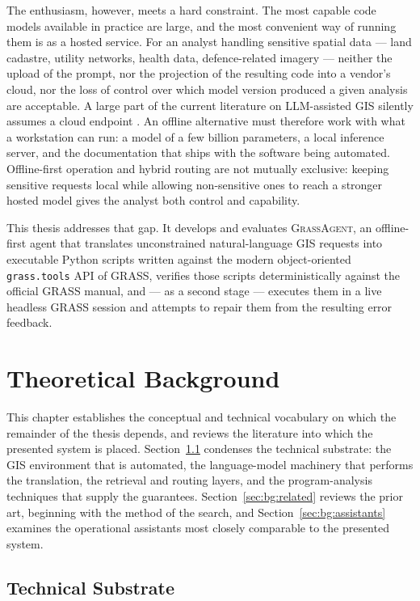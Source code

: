 The enthusiasm, however, meets a hard constraint. The most capable code models
available in practice are large, and the most convenient way of running them is
as a hosted service. For an analyst handling sensitive spatial data --- land
cadastre, utility networks, health data, defence-related imagery --- neither the
upload of the prompt, nor the projection of the resulting code into a vendor's
cloud, nor the loss of control over which model version produced a given
analysis are acceptable. A large part of the current literature on LLM-assisted
GIS silently assumes a cloud endpoint \cite{mansourian2024chatgeoai,singh2024geollmengine}.
An offline alternative must therefore work with what a workstation can run: a
model of a few billion parameters, a local inference server, and the
documentation that ships with the software being automated. Offline-first
operation and hybrid routing are not mutually exclusive: keeping sensitive
requests local while allowing non-sensitive ones to reach a stronger hosted
model gives the analyst both control and capability.

This thesis addresses that gap. It develops and evaluates \textsc{GrassAgent},
an offline-first agent that translates unconstrained natural-language GIS
requests into executable Python scripts written against the modern
object-oriented \texttt{grass.tools} API of GRASS, verifies those scripts
deterministically against the official GRASS manual, and --- as a second stage
--- executes them in a live headless GRASS session and attempts to repair them
from the resulting error feedback.


\chapter{Theoretical Background}
\label{ch:background}

This chapter establishes the conceptual and technical vocabulary on which the
remainder of the thesis depends, and reviews the literature into which the
presented system is placed. Section~\ref{sec:bg:substrate} condenses the
technical substrate: the GIS environment that is automated, the language-model
machinery that performs the translation, the retrieval and routing layers, and
the program-analysis techniques that supply the guarantees.
Section~\ref{sec:bg:related} reviews the prior art, beginning with the method
of the search, and Section~\ref{sec:bg:assistants} examines the operational
assistants most closely comparable to the presented system.

\section{Technical Substrate}
\label{sec:bg:substrate}

